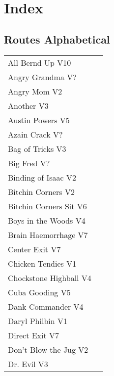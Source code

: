\chapter{Index}
\lhead{\textcolor{\chapterColor}{\rule[-2pt]{\textwidth}{15pt}}}
\section{Routes Alphabetical}
\begin{center}
\begin{supertabular}{lr}
All Bernd Up V10 & \pageref{rt:All Bernd Up} \\
Angry Grandma V? & \pageref{rt:Angry Grandma} \\
Angry Mom V2 & \pageref{rt:Angry Mom} \\
Another V3 & \pageref{rt:Another} \\
Austin Powers V5 & \pageref{rt:Austin Powers} \\
Azain Crack V? & \pageref{rt:Azain Crack} \\
Bag of Tricks V3 & \pageref{vr:Bag of Tricks} \\
Big Fred V? & \pageref{rt:Big Fred} \\
Binding of Isaac V2 & \pageref{rt:Binding of Isaac} \\
Bitchin Corners V2 & \pageref{rt:Bitchin Corners} \\
Bitchin Corners Sit V6 & \pageref{vr:Bitchin Corners Sit} \\
Boys in the Woods V4 & \pageref{rt:Boys in the Woods} \\
Brain Haemorrhage V7 & \pageref{vr:Brain Haemorrhage} \\
Center Exit V7 & \pageref{vr:Center Exit} \\
Chicken Tendies V1 & \pageref{rt:Chicken Tendies} \\
Chockstone Highball V4 & \pageref{rt:Chockstone Highball} \\
Cuba Gooding V5 & \pageref{rt:Cuba Gooding} \\
Dank Commander V4 & \pageref{rt:Dank Commander} \\
Daryl Philbin V1 & \pageref{rt:Daryl Philbin} \\
Direct Exit V7 & \pageref{vr:Direct Exit} \\
Don't Blow the Jug V2 & \pageref{rt:Don't Blow the Jug} \\
Dr. Evil V3 & \pageref{rt:Dr. Evil} \\

\end{supertabular}
\end{center}
